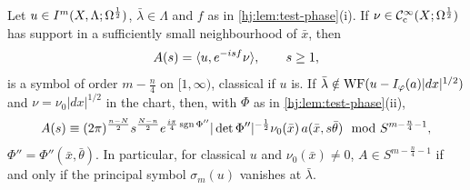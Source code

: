 \begin{proposition}\label{hj:prop:testing}
  Let $u\in I^{m}(X,\Lambda;\Omega^{\frac12})$, $\bar\lambda\in\Lambda$ and $f$ as in
  \cref{hj:lem:test-phase}(i).  If $\nu\in\mathcal{C}^\infty_{\mathrm{c}}(X;\Omega^{\frac12})$ has support in a
  sufficiently small neighbourhood of $\bar x$, then
  \begin{equation*}
    A(s)=\langle u, e^{-isf}\nu\rangle,\qquad s\ge1,
  \end{equation*}
  is a symbol of order $m-\frac n4$ on $[1,\infty)$, classical if $u$ is.  If
  $\bar\lambda\notin\operatorname{WF}(u-I_\varphi(a)|dx|^{1/2})$ and $\nu=\nu_0|dx|^{1/2}$ in the
  chart, then, with $\Phi$ as in \cref{hj:lem:test-phase}(ii),
  \begin{equation}\label{hj:eq:testing}
    A(s)\equiv(2\pi)^{\frac{n-N}2}s^{\frac{N-n}2}e^{\frac{i\pi}4\operatorname{sgn}\Phi''}
    |\det\Phi''|^{-\frac12}\nu_0(\bar x)\,a(\bar x,s\bar\theta)\mod
    S^{m-\frac n4-1},
  \end{equation}
  $\Phi''=\Phi''(\bar x,\bar\theta)$.  In particular, for classical $u$ and
  $\nu_0(\bar x)\neq0$, $A\in S^{m-\frac n4-1}$ if and only if the principal symbol
  $\sigma_m(u)$ vanishes at $\bar\lambda$.
\end{proposition}
